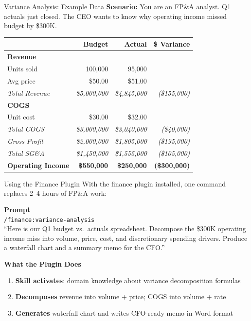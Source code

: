 \documentclass[aspectratio=169]{beamer}
\begin{document}
\begin{frame}[shrink=5]{Variance Analysis: Example Data}
\textbf{Scenario:} You are an FP\&A analyst. Q1 actuals just closed. The CEO wants to know why operating income missed budget by \$300K.
\vspace{0.2cm}
\begin{center}
\scriptsize
\begin{tabular}{@{} l r r r @{}}
\toprule
& \textbf{Budget} & \textbf{Actual} & \textbf{\$ Variance} \\
\midrule
\textbf{Revenue} & & & \\
\quad Units sold & 100,000 & 95,000 & \\
\quad Avg price & \$50.00 & \$51.00 & \\
\quad \textit{Total Revenue} & \textit{\$5,000,000} & \textit{\$4,845,000} & \textit{(\$155,000)} \\
\midrule
\textbf{COGS} & & & \\
\quad Unit cost & \$30.00 & \$32.00 & \\
\quad \textit{Total COGS} & \textit{\$3,000,000} & \textit{\$3,040,000} & \textit{(\$40,000)} \\
\midrule
\textit{Gross Profit} & \textit{\$2,000,000} & \textit{\$1,805,000} & \textit{(\$195,000)} \\
\midrule
\textit{Total SG\&A} & \textit{\$1,450,000} & \textit{\$1,555,000} & \textit{(\$105,000)} \\
\midrule
\textbf{Operating Income} & \textbf{\$550,000} & \textbf{\$250,000} & \textbf{(\$300,000)} \\
\bottomrule
\end{tabular}
\end{center}
\end{frame}

\begin{frame}[shrink=5]{Using the Finance Plugin}
With the finance plugin installed, one command replaces 2--4 hours of FP\&A work:
\vspace{0.2cm}

\textbf{Prompt}\\
\texttt{/finance:variance-analysis}\\[0.3em]
\small ``Here is our Q1 budget vs.\ actuals spreadsheet. Decompose the \$300K operating income miss into volume, price, cost, and discretionary spending drivers.  Produce a waterfall chart and a summary memo for the CFO.''
\normalsize
\vspace{0.2cm}

\textbf{What the Plugin Does}
\begin{enumerate}\small
  \item \textbf{Skill activates}: domain knowledge about variance decomposition formulas
  \item \textbf{Decomposes} revenue into volume + price; COGS into volume + rate
  \item \textbf{Generates} waterfall chart and writes CFO-ready memo in Word format
\end{enumerate}
\end{frame}
\end{document}
